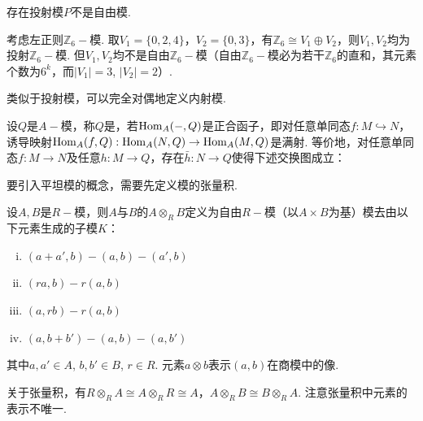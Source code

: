 \begin{instance}
    存在投射模$P$不是自由模.\par
    考虑左正则$\mathbb{Z}_6-\!\!$模. 取$V_1 = \{0,2,4\}$，$V_2 = \{0,3\}$，有$\mathbb{Z}_6 \cong V_1 \oplus V_2$，则$V_1, V_2$均为投射$\mathbb{Z}_6-\!\!$模. 但$V_1, V_2$均不是自由$\mathbb{Z}_6-\!\!$模（自由$\mathbb{Z}_6-\!\!$模必为若干$\mathbb{Z}_6$的直和，其元素个数为$6^k$，而$|V_1|=3$, $|V_2|=2$）.
\end{instance}

类似于投射模，可以完全对偶地定义内射模.

\begin{definition}[内射模]
    设$Q$是$A-\!\!$模，称$Q$是，若$\operatorname{Hom}_A(-, Q)$是正合函子，即对任意单同态$f: M \hookrightarrow N$，诱导映射$\operatorname{Hom}_A(f, Q): \operatorname{Hom}_A(N, Q) \to \operatorname{Hom}_A(M, Q)$是满射. 等价地，对任意单同态$f: M \to N$及任意$h: M \to Q$，存在$\bar{h}: N \to Q$使得下述交换图成立：
    \begin{center}
    \end{center}
\end{definition}

要引入平坦模的概念，需要先定义模的张量积.

\begin{definition}[模的张量积]
    设$A, B$是$R-\!\!$模，则$A$与$B$的$A \otimes_R B$定义为自由$R-\!\!$模（以$A \times B$为基）模去由以下元素生成的子模$K$：
    \begin{enumerate}[(i)]
        \item $(a+a', b) - (a,b) - (a',b)$
        \item $(ra, b) - r(a,b)$
        \item $(a, rb) - r(a,b)$
        \item $(a, b+b') - (a,b) - (a,b')$
    \end{enumerate}
    其中$a, a' \in A$, $b, b' \in B$, $r \in R$. 元素$a \otimes b$表示$(a,b)$在商模中的像.
\end{definition}

关于张量积，有$R \otimes_R A \cong A \otimes_R R \cong A$，$A \otimes_R B \cong B \otimes_R A$. 注意张量积中元素的表示不唯一.

